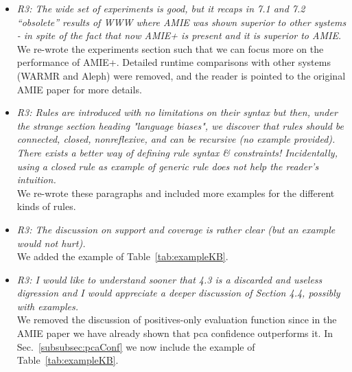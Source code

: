 \begin{figure*}[t!]
\hspace{.1\textwidth}
\begin{minipage}{.8\textwidth}
\large 
     \begin{itemize}   
      
      \item \textit{R3: The wide set of experiments is good, but it recaps in 7.1 and 7.2 ``obsolete'' results of WWW where AMIE was shown superior to other systems - 
      in spite of the fact that now AMIE+ is present and it is superior to AMIE. \\  }
      We re-wrote the experiments section such that we can focus more on the performance of AMIE+. Detailed runtime comparisons with other systems (WARMR and Aleph)
      were removed, and the reader is pointed to the original AMIE paper for more details.
      
      \item \textit{R3: Rules are introduced with no limitations on their syntax but then, under the strange section heading "language biases", 
      we discover that rules should be connected, closed, nonreflexive, and can be recursive (no example provided).       
      There exists a better way of defining rule syntax \& constraints! Incidentally, using a closed rule as example of generic rule does not help the reader's intuition. \\  }
      We re-wrote these paragraphs and included more examples for the different kinds of rules.

      \item \textit{R3: The discussion on support and coverage is rather clear (but an example would not hurt).\\  }
      We added the example of  Table~\ref{tab:exampleKB}.
      
      \item \textit{R3: I would like to understand sooner that 4.3 is a discarded and useless digression and I would appreciate a deeper discussion of Section 4.4, possibly with examples.\\  }
      We removed the discussion of positives-only evaluation function since in the AMIE paper we have already shown that pca confidence outperforms it. In Sec.~\ref{subsubsec:pcaConf}
      we now include the example of Table~\ref{tab:exampleKB}.
      
   
  \end{itemize}
\end{minipage}
\end{figure*}

